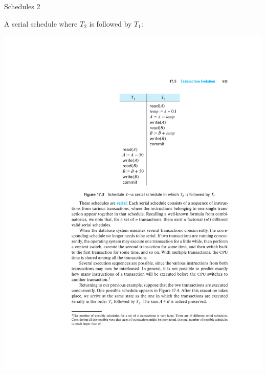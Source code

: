\documentclass{beamer}
\begin{document}
\begin{frame}{Schedules 2}

    A serial schedule where $T_2$ is followed by $T_1$:
    \begin{center}
        \includegraphics[width=\textwidth, trim={2cm 14.25cm 2cm 4cm}, clip]{figures/p840_schedule2}
    \end{center}

\end{frame}
\end{document}
